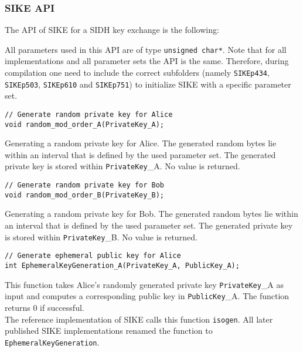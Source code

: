 \subsubsection{\gls{SIKE} API}
The API of \gls{SIKE} for a \gls{SIDH} key exchange is the following:

All parameters used in this API are of type \texttt{unsigned char*}. Note that for all implementations and all parameter sets the API is the same. Therefore, during compilation one need to include the correct subfolders (namely \texttt{SIKEp434}, \texttt{SIKEp503}, \texttt{SIKEp610} and \texttt{SIKEp751}) to initialize \gls{SIKE} with a specific parameter set.


\begin{lstlisting}[]
// Generate random private key for Alice
void random_mod_order_A(PrivateKey_A);
\end{lstlisting}
Generating a random private key for Alice. The generated random bytes lie within an interval that is defined by the used parameter set. The generated private key is stored within \textcolor{keywordcol}{\texttt{PrivateKey}\_A}. No value is returned.

\begin{lstlisting}[]
// Generate random private key for Bob
void random_mod_order_B(PrivateKey_B);
\end{lstlisting}
Generating a random private key for Bob. The generated random bytes lie within an interval that is defined by the used parameter set. The generated private key is stored within \textcolor{keywordcol}{\texttt{PrivateKey}\_B}. No value is returned.

\begin{lstlisting}[]
// Generate ephemeral public key for Alice
int EphemeralKeyGeneration_A(PrivateKey_A, PublicKey_A);
\end{lstlisting}
This function takes Alice's randomly generated private key \textcolor{keywordcol}{\texttt{PrivateKey}\_A} as input and computes a corresponding public key in \textcolor{keywordcol}{\texttt{PublicKey}\_A}. The function returns 0 if successful.\\
The reference implementation of SIKE calls this function \texttt{isogen}. All later published SIKE implementations renamed the function to \texttt{EphemeralKeyGeneration}.

